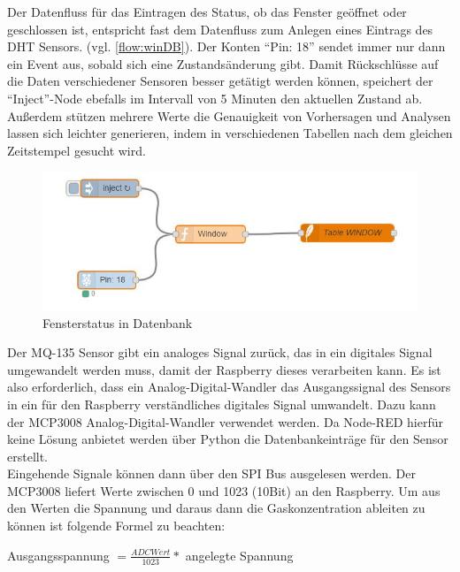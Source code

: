 Der Datenfluss für das Eintragen des Status, ob das Fenster geöffnet oder geschlossen ist, entspricht fast dem Datenfluss zum Anlegen eines Eintrags des DHT Sensors. (vgl. \autoref{flow:winDB}). Der Konten \enquote{Pin: 18} sendet immer nur dann ein Event aus, sobald sich eine Zustandsänderung gibt. Damit Rückschlüsse auf die Daten verschiedener Sensoren besser getätigt werden können, speichert der \enquote{Inject}-Node ebefalls im Intervall von 5 Minuten den aktuellen Zustand ab. 
Außerdem stützen mehrere Werte die Genauigkeit von Vorhersagen und Analysen lassen sich leichter generieren, indem in verschiedenen Tabellen nach dem gleichen Zeitstempel gesucht wird.
\begin{figure}[h]
	\centering
	\includegraphics[scale=0.7]{images/windowIntoDB}
	\caption{Fensterstatus in Datenbank}
	\label{flow:winDB}
\end{figure}

Der MQ-135 Sensor gibt ein analoges Signal zurück, das in ein digitales Signal umgewandelt werden muss, damit der Raspberry dieses verarbeiten kann. Es ist also erforderlich, dass ein Analog-Digital-Wandler das Ausgangssignal des Sensors in ein für den Raspberry verständliches digitales Signal umwandelt. Dazu kann der MCP3008 Analog-Digital-Wandler verwendet werden. Da Node-RED hierfür keine Lösung anbietet werden über Python die Datenbankeinträge für den Sensor erstellt.
\\Eingehende Signale können dann über den \acf{SPI} Bus ausgelesen werden. Der MCP3008 liefert Werte zwischen 0 und 1023 (10Bit) an den Raspberry. Um aus den Werten die Spannung und daraus dann die Gaskonzentration ableiten zu können ist folgende Formel zu beachten\cite{gas:MQX}:\\
\begin{center} Ausgangsspannung $=  \frac{ADC Wert}{1023} *  $ angelegte Spannung\end{center}

